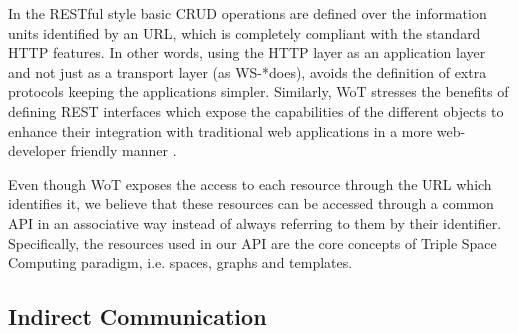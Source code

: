 In the RESTful style basic CRUD operations are defined over the information units identified by an URL, which is completely compliant with the standard HTTP features.
In other words, using the HTTP layer as an application layer and not just as a transport layer (as WS-*does), avoids the definition of extra protocols keeping the applications simpler.
Similarly, WoT stresses the benefits of defining REST interfaces which expose the capabilities of the different objects to enhance their integration with traditional web applications in a more web-developer friendly manner
\cite{dguinard-rest-vs-ws}.

Even though WoT exposes the access to each resource through the URL which identifies it, we believe that these
resources can be accessed through a common API in an associative way instead of always referring to them by their
identifier. Specifically, the resources used in our API are the core concepts of Triple Space Computing paradigm, i.e.
spaces, graphs and templates.



\subsection{Indirect Communication}
\label{sec:indirect_communication}


